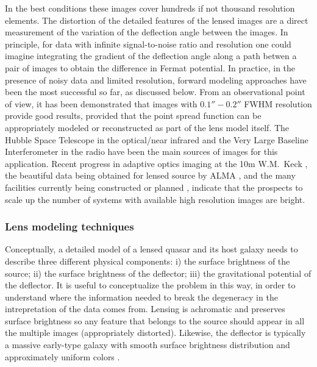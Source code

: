 In the best conditions these images cover hundreds if not thousand
resolution elements. The distortion of the detailed features of the
lensed images are a direct measurement of the variation of the
deflection angle between the images.  In principle, for data with
infinite signal-to-noise ratio and resolution one could imagine
integrating the gradient of the deflection angle along a path betwen a
pair of images to obtain the difference in Fermat potential. In
practice, in the presence of noisy data and limited resolution,
forward modeling approaches have been the most successful so far, as
discussed below. From an observational point of view, it has been
demonstrated that images with $0.1''-0.2''$ FWHM resolution provide
good results, provided that the point spread function can be
appropriately modeled or reconstructed as part of the lens model
itself. The Hubble Space Telescope in the optical/near infrared
\citep{Suy++10,Suy++13,Suy++14,BirrerEtal2015} and the Very Large Baseline
Interferometer in the radio \citep{WBB04} have been the main sources
of images for this application. Recent progress in adaptive optics
imaging at the 10m W.M.~Keck \citep{Che++16}, the beautiful data being
obtained for lensed source by ALMA \citep{Hez++13a}, and the many
facilities currently being constructed or planned \citep{Men++15},
indicate that the prospects to scale up the number of systems with
available high resolution images are bright.


\subsubsection{Lens modeling techniques}

Conceptually, a detailed model of a lensed quasar and its host galaxy
needs to describe three different physical components: i) the surface
brightness of the source; ii) the surface brightness of the deflector;
iii) the gravitational potential of the deflector. It is useful to
conceptualize the problem in this way, in order to understand where
the information needed to break the degeneracy in the intrepretation
of the data comes from. Lensing is achromatic and preserves surface
brightness so any feature that belongs to the source \cite[including
in line of sight velocity][]{Hez++13} should appear in all the
multiple images (appropriately distorted). Likewise, the deflector is
typically a massive early-type galaxy with smooth surface brightness
distribution and approximately uniform colors \cite[except for dust,
see, e.g.][]{Suy++10}.


